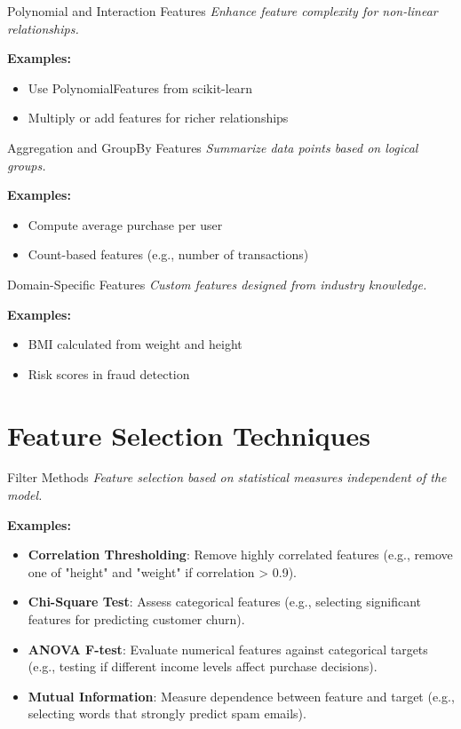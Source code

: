\documentclass{beamer}
\begin{document}
\begin{frame}{Polynomial and Interaction Features}
  \textit{Enhance feature complexity for non-linear relationships.}  

  \textbf{Examples:}  
  \begin{itemize}
    \item Use PolynomialFeatures from scikit-learn
    \item Multiply or add features for richer relationships
  \end{itemize}
\end{frame}

\begin{frame}{Aggregation and GroupBy Features}
  \textit{Summarize data points based on logical groups.}  

  \textbf{Examples:}  
  \begin{itemize}
    \item Compute average purchase per user
    \item Count-based features (e.g., number of transactions)
  \end{itemize}
\end{frame}

\begin{frame}{Domain-Specific Features}
  \textit{Custom features designed from industry knowledge.}  

  \textbf{Examples:}  
  \begin{itemize}
    \item BMI calculated from weight and height
    \item Risk scores in fraud detection
  \end{itemize}
\end{frame}


\section{Feature Selection Techniques}

\begin{frame}{Filter Methods}
    \textit{Feature selection based on statistical measures independent of the model.}

    \textbf{Examples:}  
    \begin{itemize}
        \item \textbf{Correlation Thresholding}: Remove highly correlated features (e.g., remove one of "height" and "weight" if correlation > 0.9).
        \item \textbf{Chi-Square Test}: Assess categorical features (e.g., selecting significant features for predicting customer churn).
        \item \textbf{ANOVA F-test}: Evaluate numerical features against categorical targets (e.g., testing if different income levels affect purchase decisions).
        \item \textbf{Mutual Information}: Measure dependence between feature and target (e.g., selecting words that strongly predict spam emails).
    \end{itemize}
\end{frame}
\end{document}
